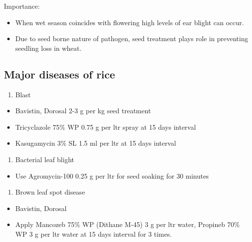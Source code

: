 \documentclass[
  openany]{book}
\providecommand{\tightlist}{%
  \setlength{\itemsep}{0pt}\setlength{\parskip}{0pt}}
\begin{document}
Importance:

\begin{itemize}
\tightlist
\item
  When wet season coincides with flowering high levels of ear blight can occur.
\item
  Due to seed borne nature of pathogen, seed treatment plays role in preventing seedling loss in wheat.
\end{itemize}

\hypertarget{major-diseases-of-rice}{%
\subsection{Major diseases of rice}\label{major-diseases-of-rice}}

\begin{enumerate}
\def\labelenumi{\arabic{enumi}.}
\tightlist
\item
  Blast
\end{enumerate}

\begin{itemize}
\tightlist
\item
  Bavistin, Dorosal 2-3 g per kg seed treatment
\item
  Tricyclazole 75\% WP 0.75 g per ltr spray at 15 days interval
\item
  Kasugamycin 3\% SL 1.5 ml per ltr at 15 days interval
\end{itemize}

\begin{enumerate}
\def\labelenumi{\arabic{enumi}.}
\setcounter{enumi}{1}
\tightlist
\item
  Bacterial leaf blight
\end{enumerate}

\begin{itemize}
\tightlist
\item
  Use Agromycin-100 0.25 g per ltr for seed soaking for 30 minutes
\end{itemize}

\begin{enumerate}
\def\labelenumi{\arabic{enumi}.}
\setcounter{enumi}{2}
\tightlist
\item
  Brown leaf spot disease
\end{enumerate}

\begin{itemize}
\tightlist
\item
  Bavistin, Dorosal
\item
  Apply Mancozeb 75\% WP (Dithane M-45) 3 g per ltr water, Propineb 70\% WP 3 g per ltr water at 15 days interval for 3 times.
\end{itemize}
\end{document}
